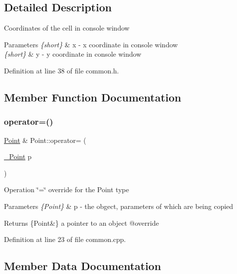 \subsection{Detailed Description}
Coordinates of the cell in console window 
\begin{DoxyParams}{Parameters}
{\em \{short\}} & x -\/ x coordinate in console window \\
\hline
{\em \{short\}} & y -\/ y coordinate in console window \\
\hline
\end{DoxyParams}


Definition at line 38 of file common.\+h.



\subsection{Member Function Documentation}
\mbox{\label{struct___point_acf5181d8cc6c6bd73a73aa1da2d980cb}} 
\subsubsection{\texorpdfstring{operator=()}{operator=()}}
{\footnotesize\ttfamily \mbox{\hyperlink{common_8h_aa9cfdb80b4ca12013a2de8a3b9b97981}{Point}} \& Point\+::operator= (\begin{DoxyParamCaption}\item[{\mbox{\hyperlink{struct___point}{\+\_\+\+Point}}}]{p }\end{DoxyParamCaption})}

Operation \char`\"{}=\char`\"{} override for the Point type 
\begin{DoxyParams}{Parameters}
{\em \{\+Point\}} & p -\/ the obgect, parameters of which are being copied \\
\hline
\end{DoxyParams}
\begin{DoxyReturn}{Returns}
\{Point\&\} a pointer to an object @override 
\end{DoxyReturn}


Definition at line 23 of file common.\+cpp.



\subsection{Member Data Documentation}
\mbox{\label{struct___point_af909fc976d09ac1f11878b4bdcfa10ca}} 
